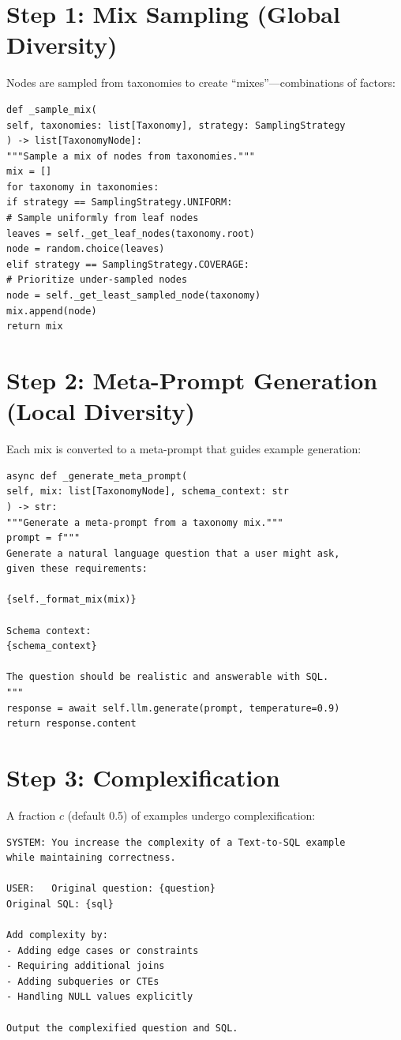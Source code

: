 \documentclass[12pt,a4paper,twoside]{report}
\begin{document}
\section{Step 1: Mix Sampling (Global Diversity)}

Nodes are sampled from taxonomies to create ``mixes''---combinations of factors:

\begin{lstlisting}[language=jsonx,caption={Mix sampling (simula\_data\_generator.py, lines 120--150)}]
def _sample_mix(
self, taxonomies: list[Taxonomy], strategy: SamplingStrategy
) -> list[TaxonomyNode]:
"""Sample a mix of nodes from taxonomies."""
mix = []
for taxonomy in taxonomies:
if strategy == SamplingStrategy.UNIFORM:
# Sample uniformly from leaf nodes
leaves = self._get_leaf_nodes(taxonomy.root)
node = random.choice(leaves)
elif strategy == SamplingStrategy.COVERAGE:
# Prioritize under-sampled nodes
node = self._get_least_sampled_node(taxonomy)
mix.append(node)
return mix
\end{lstlisting}

\section{Step 2: Meta-Prompt Generation (Local Diversity)}

Each mix is converted to a meta-prompt that guides example generation:

\begin{lstlisting}[language=jsonx,caption={Meta-prompt generation}]
async def _generate_meta_prompt(
self, mix: list[TaxonomyNode], schema_context: str
) -> str:
"""Generate a meta-prompt from a taxonomy mix."""
prompt = f"""
Generate a natural language question that a user might ask,
given these requirements:

{self._format_mix(mix)}

Schema context:
{schema_context}

The question should be realistic and answerable with SQL.
"""
response = await self.llm.generate(prompt, temperature=0.9)
return response.content
\end{lstlisting}

\section{Step 3: Complexification}

A fraction $c$ (default 0.5) of examples undergo complexification:

\begin{lstlisting}[language=jsonx,caption={Complexification prompt}]
SYSTEM: You increase the complexity of a Text-to-SQL example
while maintaining correctness.

USER:   Original question: {question}
Original SQL: {sql}

Add complexity by:
- Adding edge cases or constraints
- Requiring additional joins
- Adding subqueries or CTEs
- Handling NULL values explicitly

Output the complexified question and SQL.
\end{lstlisting}
\end{document}
